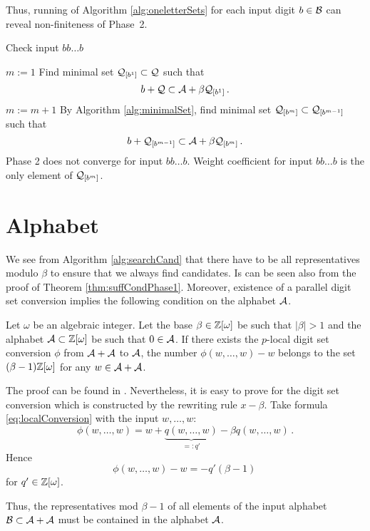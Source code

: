Thus, running of Algorithm \ref{alg:oneletterSets} for each input digit $b\in\mathcal{B}$ can reveal non-finiteness of Phase~2.

\begin{algorithm}
  \caption{Check input $bb\dots b$}
    \label{alg:oneletterSets}
  \begin{algorithmic}[1]
    \STATE $m:=1$
    \STATE Find minimal set $\mathcal{Q}_{[b^{1}]} \subset \mathcal{Q}$ such that
      $$
      b + \mathcal{Q} \subset \mathcal{A} + \beta \mathcal{Q}_{[b^{1}]}\,.
      $$
      \vspace{-20pt}
        \STATE $m:= m +1$
        \STATE By Algorithm \ref{alg:minimalSet}, find minimal set $\mathcal{Q}_{[b^{m}]} \subset \mathcal{Q}_{[b^{m-1}]}$ such that
          $$
          b + \mathcal{Q}_{[b^{m-1}]} \subset \mathcal{A} + \beta \mathcal{Q}_{[b^{m}]}\,.
          $$  
          \vspace{-20pt}
            \RETURN Phase 2 does not converge for input $bb\dots b$.
        \ENDIF
    \ENDWHILE  
    \RETURN Weight coefficient for input $bb\dots b$ is the only element of $\mathcal{Q}_{[b^{m}]}$.
  \end{algorithmic}
\end{algorithm}


\section{Alphabet}
We see from Algorithm \ref{alg:searchCand} that there have to be all representatives modulo $\beta$ to ensure that we always find candidates. Is can be seen also from the proof of Theorem \ref{thm:suffCondPhase1}. Moreover, existence of a parallel digit set conversion implies the following condition on the alphabet $\mathcal{A}$.   
\begin{theo}
Let $\omega$ be an algebraic integer. Let the base $\beta\in\mathbb{Z}[\omega]$ be such that $|\beta|>1$ and the alphabet $\mathcal{A}\subset\mathbb{Z}[\omega]$ be such that $0\in\mathcal{A}$. If there exists the $p$-local digit set conversion $\phi$ from  $\mathcal{A}+\mathcal{A}$ to $\mathcal{A}$, the number $\phi(w,\dots,w)-w$ belongs to the set $(\beta-1)\mathbb{Z}[\omega]$ for any $w\in\mathcal{A}+\mathcal{A}$. 
\end{theo}
The proof can be found in \cite{minAlph}. Nevertheless, it is easy to prove for the digit set conversion which is constructed by the rewriting rule $x-\beta$. Take formula \ref{eq:localConversion} with the input $w,\dots,w$:
$$
    \phi(w, \dots, w)=w+ \underbrace{q(w, \dots, w)}_{=:q'} - \beta q(w, \dots, w)\,.
$$
Hence
$$
\phi(w, \dots, w)-w=-q'(\beta-1)\,
$$
for $q'\in\mathbb{Z}[\omega]$.

Thus, the representatives mod $\beta-1$ of all elements of the input alphabet $\mathcal{B}\subset\mathcal{A}+\mathcal{A}$ must be contained in the alphabet $\mathcal{A}$. 

